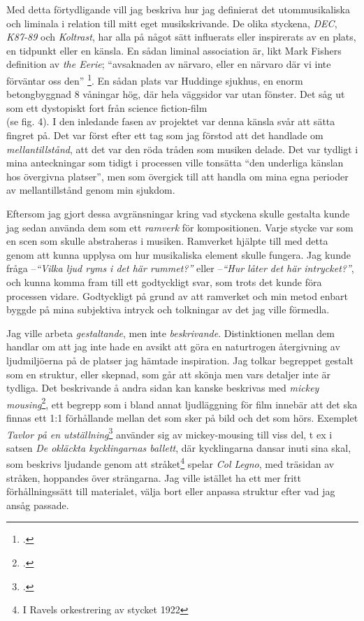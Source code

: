 \documentclass{article}
\begin{document}
Med detta förtydligande vill jag beskriva hur jag definierat det utommusikaliska och liminala i
relation till mitt eget musikskrivande. De olika styckena, \emph{DEC}, \emph{K87-89} och \emph{Koltrast}, har
alla på något sätt influerats eller inspirerats av en plats, en tidpunkt eller en känsla. 
En sådan liminal association är, likt Mark Fishers definition av \emph{the Eerie};
``avsaknaden av närvaro, eller en närvaro där vi inte förväntar oss den''
\footcite[Egen översättning, s. 12]{Fisher}.
En sådan plats var Huddinge sjukhus, en enorm betongbyggnad 8 våningar hög, där hela väggsidor var utan
fönster. Det såg ut som ett dystopiskt fort från science fiction-film \\(se fig. 4). I den inledande fasen av
projektet var denna känsla svår att sätta fingret på. Det var först efter ett tag som jag förstod att det
handlade om \emph{mellantillstånd}, att det var den röda tråden som musiken delade. Det var tydligt i mina
anteckningar som tidigt i processen ville tonsätta ``den underliga känslan hos övergivna platser'', men som
övergick till att handla om mina egna perioder av mellantillstånd genom min sjukdom.

Eftersom jag gjort dessa avgränsningar kring vad styckena skulle gestalta kunde jag sedan använda dem som ett
\emph{ramverk} för kompositionen. Varje stycke var som en scen som skulle abstraheras i musiken. Ramverket
hjälpte till med detta genom att kunna upplysa om hur musikaliska element skulle fungera. Jag kunde fråga 
--\emph{``Vilka ljud ryms i det här rummet?''} eller --\emph{``Hur låter det här intrycket?''}, och kunna
komma fram till ett godtyckligt svar, som trots det kunde föra processen vidare. Godtyckligt på grund av att
ramverket och min metod enbart byggde på mina subjektiva intryck och tolkningar av det jag ville förmedla.


Jag ville arbeta \emph{gestaltande}, men inte \emph{beskrivande}. Distinktionen mellan dem handlar om att jag
inte hade en avsikt att göra en naturtrogen återgivning av ljudmiljöerna på de platser jag hämtade
inspiration. Jag tolkar begreppet gestalt som en struktur, eller skepnad, som går att skönja men vars detaljer
inte är tydliga. Det beskrivande å andra sidan kan kanske beskrivas med \emph{mickey
mousing}\footcite{mickeymouse}, ett begrepp som i bland annat ljudläggning för film innebär att det ska finnas
ett 1:1 förhållande mellan det som sker på bild och det som hörs. Exemplet \emph{Tavlor på en
utställning}\footcite{Tavlor} använder sig av mickey-mousing till viss del, t ex i satsen \emph{De okläckta
kycklingarnas ballett}, där kycklingarna dansar inuti sina skal, som beskrivs ljudande genom att
stråket\footnote{I Ravels orkestrering av stycket 1922} spelar \emph{Col Legno}, med träsidan av stråken,
hoppandes över strängarna. Jag ville istället ha ett mer fritt förhållningssätt till materialet, välja bort
eller anpassa struktur efter vad jag ansåg passade.
\end{document}
